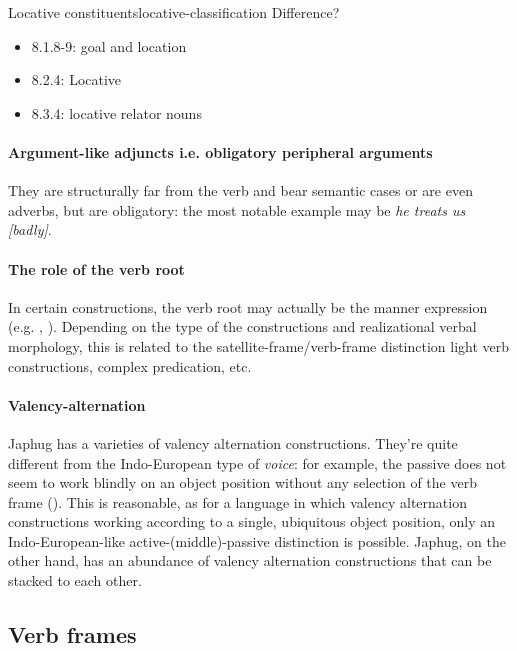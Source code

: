 \documentclass[a4paper, oneside, 12pt]{report}
\newcommand*{\term}[1]{\emph{#1}}
\newcommand{\form}[1]{\emph{#1}}
\begin{document}
\begin{todobox}{Locative constituents}{locative-classification}
    Difference?
    \begin{itemize}
        \item 8.1.8-9: goal and location
        \item 8.2.4: Locative
        \item 8.3.4: locative relator nouns
    \end{itemize}
\end{todobox}

\paragraph*{Argument-like adjuncts i.e. obligatory peripheral arguments}
They are structurally far from the verb
and bear semantic cases or are even adverbs,
but are obligatory:
the most notable example may be \form{he treats us [badly]}.

\paragraph*{The role of the verb root}
In certain constructions,
the verb root may actually be the manner expression
(e.g. \citealt{acedo2013satellite}, \citealt{punske2013three}).
Depending on the type of the constructions and realizational verbal morphology,
this is related to the satellite-frame/verb-frame distinction
light verb constructions, complex predication, etc.

\paragraph*{Valency-alternation}\label{sec:grammatical.clause.internal.valency}
Japhug has a varieties of valency alternation constructions.
They're quite different from the Indo-European type of \term{voice}: 
for example, the passive does not seem to work blindly on an object position
without any selection of the verb frame
().
This is reasonable,
as for a language in which valency alternation constructions 
working according to a single, ubiquitous object position,
only an Indo-European-like active-(middle)-passive distinction is possible.
Japhug, on the other hand, has an abundance of valency alternation constructions
that can be stacked to each other.

\subsection{Verb frames}\label{sec:grammatical.clause.frames}
\end{document}
